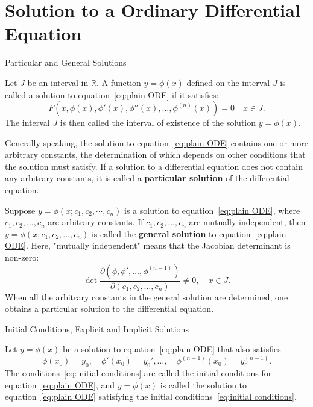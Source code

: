 \documentclass[11pt]{../../TexTemplate/elegantbook}
\begin{document}
\section{Solution to a Ordinary Differential Equation}
\begin{leftbarTitle}{Particular and General Solutions}\end{leftbarTitle}
Let $J$ be an interval in $\mathbb{R}$. 
A function $y=\phi(x)$ defined on the interval $J$ is called a solution to equation~\eqref{eq:plain ODE} if it satisfies: 
\[
F(x, \phi(x), \phi'(x), \phi''(x), \dots, \phi^{(n)}(x)) = 0 \quad x \in J. 
\]
The interval $J$ is then called the interval of existence of the solution $y = \phi(x)$.

Generally speaking, 
the solution to equation~\eqref{eq:plain ODE} contains one or more arbitrary constants, 
the determination of which depends on other conditions that the solution must satisfy. 
If a solution to a differential equation does not contain any arbitrary constants, 
it is called a \textbf{particular solution} of the differential equation.

Suppose $y = \phi(x; c_{1}, c_{2}, \cdots, c_{n})$ is a solution to equation~\eqref{eq:plain ODE}, 
where $c_{1}, c_{2}, \ldots, c_{n}$ are arbitrary constants. 
If $c_{1}, c_{2}, \ldots, c_{n}$ are mutually independent, 
then $y = \phi(x; c_{1}, c_{2}, \ldots, c_{n})$ is called the \textbf{general solution} to equation~\eqref{eq:plain ODE}. 
Here, "mutually independent" means that the Jacobian determinant is non-zero: 
\[
\det \frac{\partial(\phi, \phi', \dots, \phi^{(n-1)})}{\partial(c_1, c_2, \dots, c_n)} \neq 0, \quad x \in J.
\]
When all the arbitrary constants in the general solution are determined, 
one obtains a particular solution to the differential equation.

\begin{leftbarTitle}{Initial Conditions, Explicit and Implicit Solutions}\end{leftbarTitle}
Let $y = \phi(x)$ be a solution to equation~\eqref{eq:plain ODE} that also satisfies 
\begin{equation}\label{eq:initial conditions}
    \phi(x_0) = y_0, \quad \phi'(x_0) = y_0', \dots, \quad \phi^{(n-1)}(x_0) = y_0^{(n-1)}.
\end{equation}
The conditions~\eqref{eq:initial conditions} are called the initial conditions for equation~\eqref{eq:plain ODE}, 
and $y = \phi(x)$ is called the solution to equation~\eqref{eq:plain ODE} satisfying the initial conditions~\eqref{eq:initial conditions}.
\end{document}
